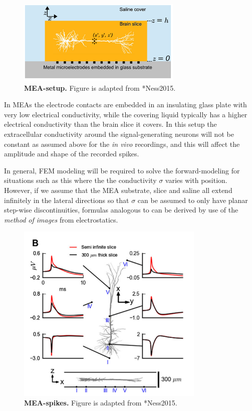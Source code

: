 \begin{figure}[!ht]
\begin{center}
\includegraphics[width=0.7\textwidth]{Figures/Spikes/Spikes-MEA-1-w43-r300}
\end{center}
\caption[]{\textbf{MEA-setup.}
Figure is adapted from \citeasnoun**{Ness2015}.}
\label{fig:Spikes:MEA-setup}
\end{figure}

In MEAs the electrode contacts are embedded in an insulating glass plate with very 
low electrical conductivity, while the covering liquid typically has a higher electrical conductivity than the brain slice it covers. In this setup the extracellular conductivity around the signal-generating neurons will not be constant as assumed above for the \textit{in vivo} recordings, and this will affect the amplitude and shape of the recorded spikes. 

In general, FEM modeling will be required to solve the forward-modeling for situations such as this where
the the conductivity $\sigma$ varies with position. However, if we assume that the MEA substrate, slice and saline
all extend infinitely in the lateral directions so that $\sigma$ can be assumed to only have planar step-wise discontinuities, 
formulas analogous to  can be derived by use of the \emph{method of images} from electrostatics. 


\begin{figure}[!ht]
\begin{center}
\includegraphics[width=0.8\textwidth]{Figures/Spikes/Spikes-MEA-2-w43-r300}
\end{center}
\caption[]{\textbf{MEA-spikes.}
Figure is adapted from \citeasnoun**{Ness2015}.}
\label{fig:Spikes:MEA-spikes}
\end{figure}

